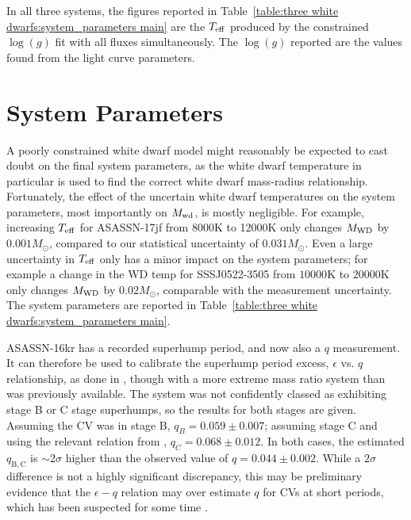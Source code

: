 In all three systems, the figures reported in Table~\ref{table:three white dwarfs:system_parameters main} are the $T_{\rm eff}$ produced by the constrained $\log (g)$ fit with all fluxes simultaneously.
The $\log (g)$ reported are the values found from the light curve parameters.


\section{System Parameters}
\label{sect:system parameters}

A poorly constrained white dwarf model might reasonably be expected to cast doubt on the final system parameters, as the white dwarf temperature in particular is used to find the correct white dwarf mass-radius relationship.
Fortunately, the effect of the uncertain white dwarf temperatures on the system parameters, most importantly on $M_{\rm wd}$, is mostly negligible.
For example, increasing $T_{\rm eff}$ for ASASSN-17jf from 8000K to 12000K only changes $M_{\rm WD}$ by $0.001M_\odot$, compared to our statistical uncertainty of $0.031 M_\odot$. Even a large uncertainty in $T_{\rm eff}$ only has a minor impact on the system parameters; for example a change in the WD temp for SSSJ0522-3505 from $10000$K to $20000$K only changes $M_{\rm WD}$ by $0.02 M_\odot$, comparable with the measurement uncertainty. The system parameters are reported in Table~\ref{table:three white dwarfs:system_parameters main}.

ASASSN-16kr has a recorded superhump period, and now also a $q$ measurement. It can therefore be used to calibrate the superhump period excess, $\epsilon$ vs. $q$ relationship, as done in \citet{McAllister2019}, though with a more extreme mass ratio system than was previously available. The system was not confidently classed as exhibiting stage B or C stage superhumps, so the results for both stages are given. Assuming the CV was in stage B, $q_B = 0.059\pm0.007$; assuming stage C and using the relevant relation from \citet{McAllister2019}, $q_C = 0.068\pm0.012$. In both cases, the estimated $q_\mathrm{B,C}$ is $\sim 2 \sigma$ higher than the observed value of $q = 0.044\pm0.002$. While a $2 \sigma$ difference is not a highly significant discrepancy, this may be preliminary evidence that the $\epsilon - q$ relation may over estimate $q$ for CVs at short periods, which has been suspected for some time \citep{pearson2007, knigge11}.


